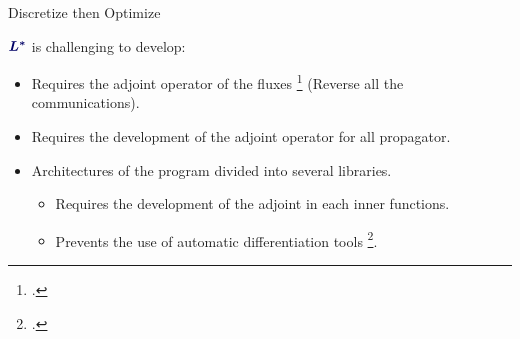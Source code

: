 \begin{frame}{Discretize then Optimize}

  $\textcolor{\myblue}{\boldsymbol{L^*}}$ is challenging to develop:

  \begin{itemize}
  \item<2-> Requires the adjoint operator of the fluxes \footcite{wilcoxDiscretelyExactDerivatives2013} (Reverse all the communications).
  \item<3-> Requires the development of the adjoint operator for all propagator.
  \item<4-> Architectures of the program divided into several libraries.
    \begin{itemize}
    \item<5-> Requires the development of the adjoint in each inner functions.
    \item<6-> Prevents the use of automatic differentiation tools \footcite{griewank2008evaluating}.
    \end{itemize}
  \end{itemize}

\end{frame}








